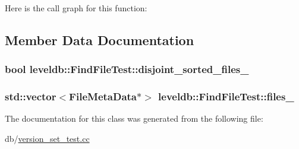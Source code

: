 Here is the call graph for this function\-:




\subsection{Member Data Documentation}
\hypertarget{classleveldb_1_1_find_file_test_acf50512be17b9a3cd96388a8c837b8e0}{
\subsubsection[{disjoint\-\_\-sorted\-\_\-files\-\_\-}]{\setlength{\rightskip}{0pt plus 5cm}bool leveldb\-::\-Find\-File\-Test\-::disjoint\-\_\-sorted\-\_\-files\-\_\-}}\label{classleveldb_1_1_find_file_test_acf50512be17b9a3cd96388a8c837b8e0}
\hypertarget{classleveldb_1_1_find_file_test_a53b61e6b01283c235fae219013b0e2c7}{
\subsubsection[{files\-\_\-}]{\setlength{\rightskip}{0pt plus 5cm}std\-::vector$<${\bf File\-Meta\-Data}$\ast$$>$ leveldb\-::\-Find\-File\-Test\-::files\-\_\-}}\label{classleveldb_1_1_find_file_test_a53b61e6b01283c235fae219013b0e2c7}


The documentation for this class was generated from the following file\-:\begin{DoxyCompactItemize}
\item 
db/\hyperlink{version__set__test_8cc}{version\-\_\-set\-\_\-test.\-cc}\end{DoxyCompactItemize}
